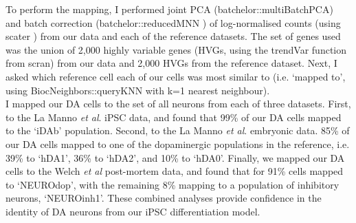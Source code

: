 To perform the mapping, I performed joint PCA (batchelor::multiBatchPCA) 
and batch correction (batchelor::reducedMNN \cite{haghverdi2018batch}) of log-normalised counts (using scater \cite{mccarthy2017scater}) from our data and each of the reference datasets. 
The set of genes used was the union of 2,000 highly variable genes (HVGs, using the trendVar function from scran) 
from our data and 2,000 HVGs from the reference dataset. 
Next, I asked which reference cell each of our cells was most similar to (i.e. ‘mapped to', using BiocNeighbors::queryKNN with k=1 nearest neighbour).\\

I mapped our DA cells to the set of all neurons from each of three datasets.
First, to the La Manno \textit{et al}. iPSC data, and found that
99\% of our DA cells mapped to the `iDAb' population.
Second, to the La Manno \textit{et al}. embryonic data. 
85\% of our DA cells mapped to one of the dopaminergic populations in the reference, i.e. 39\% to `hDA1', 36\% to `hDA2', and 10\% to `hDA0'.
Finally, we mapped our DA cells to the Welch \textit{et al} post-mortem data, and found that for 91\% cells mapped to `NEUROdop', with the remaining 8\% mapping to a population of inhibitory neurons, `NEUROinh1'.
These combined analyses provide confidence in the identity of DA neurons from our iPSC differentiation model.








